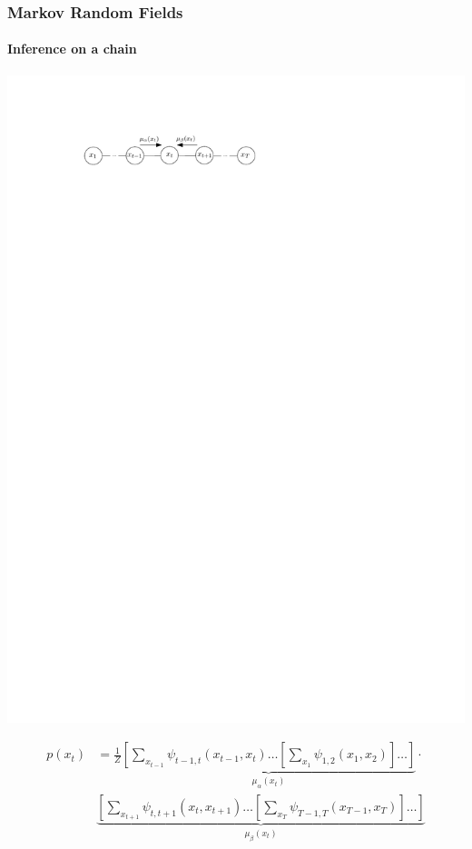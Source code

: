 \documentclass[slidestop,compress,mathserif]{beamer}
\begin{document}
\begin{frame}
	\frametitle{Markov Random Fields}
	\framesubtitle{Inference on a chain}
    \begin{center}
    \includegraphics[width=.7\textwidth]{chain1}
    \end{center}
    \begin{align*}
    p(x_t) & = \frac{1}{Z}\underbrace{\left[ \sum_{x_{t-1}}\psi_{t-1,t}(x_{t-1},x_t)\hdots
        \left[ \sum_{x_1}\psi_{1,2}(x_1,x_2)\right] \hdots \right]}_{\mu_\alpha(x_t)}\cdot\\
    &\underbrace{\left[\sum_{x_{t+1}}\psi_{t,t+1}(x_t,x_{t+1})\hdots\left[
    \sum_{x_T}\psi_{T-1,T}(x_{T-1},x_T)
    \right]\hdots\right]}_{\mu_\beta(x_t)}
    \end{align*}
  \end{frame} 
\end{document}
